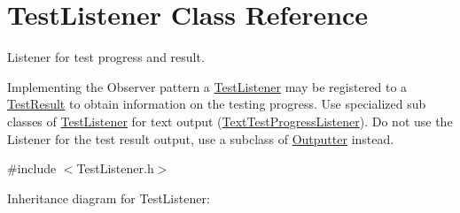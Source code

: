 \hypertarget{class_test_listener}{\section{Test\+Listener Class Reference}
\label{class_test_listener}
}


Listener for test progress and result.

Implementing the Observer pattern a \hyperlink{class_test_listener}{Test\+Listener} may be registered to a \hyperlink{class_test_result}{Test\+Result} to obtain information on the testing progress. Use specialized sub classes of \hyperlink{class_test_listener}{Test\+Listener} for text output (\hyperlink{class_text_test_progress_listener}{Text\+Test\+Progress\+Listener}). Do not use the Listener for the test result output, use a subclass of \hyperlink{class_outputter}{Outputter} instead.  




{\ttfamily \#include $<$Test\+Listener.\+h$>$}



Inheritance diagram for Test\+Listener\+:
